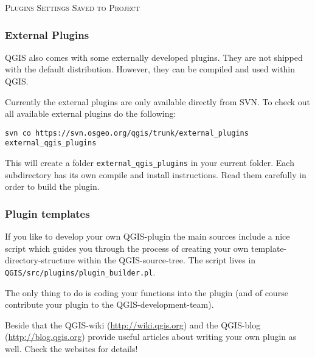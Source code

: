 \normalsize


\begin{Tip}\caption{\textsc{Plugins Settings Saved to Project}}
\end{Tip}

%
%
\subsubsection{External Plugins}\label{sec:external_plugins}

QGIS also comes with some externally developed plugins. They are not shipped with the
default distribution. However, they can be compiled and used within QGIS.

Currently the external plugins are only available directly from SVN. 
To check out all available external plugins do the following:
\begin{verbatim}
svn co https://svn.osgeo.org/qgis/trunk/external_plugins external_qgis_plugins
\end{verbatim}

This will create a folder \texttt{external\_qgis\_plugins} in your current folder.
Each subdirectory has its own compile and install instructions. Read them carefully
in order to build the plugin.

%
%
\subsubsection{Plugin templates}\label{sec:plugin_template}

If you like to develop your own QGIS-plugin the main sources include a nice script
which guides you through the process of creating your own template-directory-structure
within the QGIS-source-tree.
The script lives in \texttt{QGIS/src/plugins/plugin\_builder.pl}.

The only thing to do is coding your functions into the plugin (and of course contribute
your plugin to the QGIS-development-team).

Beside that the QGIS-wiki (\url{http://wiki.qgis.org}) and the QGIS-blog (\url{http://blog.qgis.org})
provide useful articles about writing your own plugin as well.
Check the websites for details!
